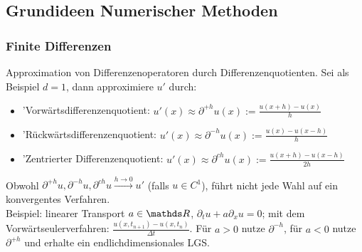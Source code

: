 \subsection{Grundideen Numerischer Methoden}

\subsubsection{Finite Differenzen}
Approximation von Differenzenoperatoren durch Differenzenquotienten. Sei als Beispiel $d=1$, dann approximiere $u'$ durch:
\begin{itemize}
	\item 'Vorwärtsdifferenzenquotient: $u'(x) \approx \partial^{+h} u(x) := \frac{u(x+h)-u(x)}{h}$
	\item 'Rückwärtsdifferenzenquotient: $u'(x) \approx \partial^{-h} u(x) := \frac{u(x)-u(x-h)}{h}$
	\item 'Zentrierter Differenzenquotient: $u'(x) \approx \partial^{ch} u(x) := \frac{u(x+h)-u(x-h)}{2h}$
\end{itemize}
Obwohl $\partial^{+h} u,\partial^{-h} u,\partial^{ch} u \stackrel{h\to 0}{\to} u'$ (falls $u\in C^1$), führt nicht jede Wahl auf ein konvergentes Verfahren.\\
Beispiel: linearer Transport $a\in \R$, $\partial_t u + a\partial_x u = 0$; mit dem Vorwärtseulerverfahren: $\frac{u(x,t_{n+1})-u(x,t_n)}{\Delta t}$.
Für $a>0$ nutze $\partial^{-h}$, für $a<0$ nutze $\partial^{+h}$ und erhalte ein endlichdimensionales LGS.









\newpage
\printindex
\listoffigures
